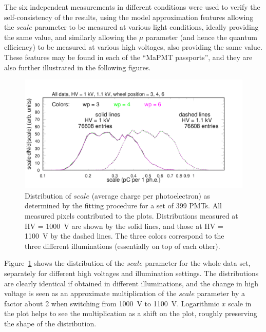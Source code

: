 The six independent measurements in different conditions were used to verify the self-consistency of the results, using the model approximation features allowing the $scale$ parameter to be measured at various light conditions, ideally providing the same value, and similarly allowing the $\mu$ parameter (and hence the quantum efficiency) to be measured at various high voltages, also providing the same value. These features may be found in each of the ``MaPMT passports'', and they are also further illustrated in the following figures. \begin{figure}[h!]
	\centering
	\includegraphics[width=0.98\linewidth,trim=0 12 50 35,clip]{figures/pglobal_sc.pdf}
	\caption{Distribution of $scale$ (average charge per photoelectron) as determined by the fitting procedure for a set of 399 PMTs. All measured pixels contributed to the plots. Distributions measured at HV = 1000~V are shown by the solid lines, and those at HV = 1100~V by the dashed lines. The three colors correspond to the three different illuminations (essentially on top of each other).
	}
	\label{fig:pglobal_sc}
\end{figure}
Figure~\ref{fig:pglobal_sc} shows the distribution of the $scale$ parameter for the whole data set, separately for different high voltages and illumination settings. The distributions are clearly identical if obtained in different illuminations, and the change in high voltage is seen as an approximate multiplication of the $scale$ parameter by a factor about 2 when switching from 1000~V to 1100~V. Logarithmic $x$ scale in the plot helps to see the multiplication as a shift on the plot, roughly preserving the shape of the distribution. 

